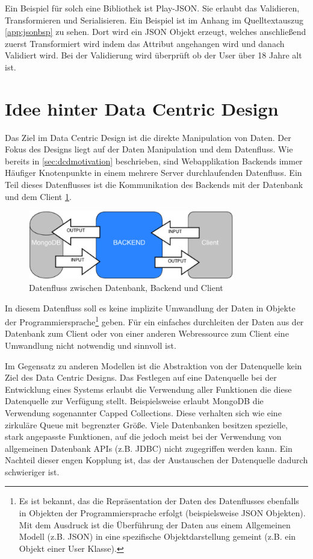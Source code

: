 Ein Beispiel für solch eine Bibliothek ist Play-JSON. Sie erlaubt das Validieren, Transformieren und Serialisieren. Ein Beispiel ist im Anhang im Quelltextauszug \ref{app:jsonbsp} zu sehen. Dort wird ein JSON Objekt erzeugt, welches anschließend zuerst Transformiert wird indem das Attribut  angehangen wird und danach Validiert wird. Bei der Validierung wird überprüft ob der User über 18 Jahre alt ist.

\section{Idee hinter Data Centric Design}
Das Ziel im Data Centric Design ist die direkte Manipulation von Daten. Der Fokus des Designs liegt auf der Daten Manipulation und dem Datenfluss. Wie bereits in \ref{sec:dcdmotivation} beschrieben, sind Webapplikation Backends immer Häufiger Knotenpunkte in einem mehrere Server durchlaufenden Datenfluss. Ein Teil dieses Datenflusses ist die Kommunikation des Backends mit der Datenbank und dem Client \ref{fig:dataflow}. 

\begin{figure}[h]   
  \centering     
  \includegraphics[width=0.8\textwidth]{img/dataflow.png}  
   \caption{Datenfluss zwischen Datenbank, Backend und Client}   
  \label{fig:dataflow} 
\end{figure}

In diesem Datenfluss soll es keine implizite Umwandlung der Daten in Objekte der Programmiersprache\footnote{Es ist bekannt, das die Repräsentation der Daten des Datenflusses ebenfalls in Objekten der Programmiersprache erfolgt (beispielsweise JSON Objekten). Mit dem Ausdruck ist die Überführung der Daten aus einem Allgemeinen Modell (z.B. JSON) in eine spezifische Objektdarstellung gemeint (z.B. ein Objekt einer User Klasse).} geben. Für ein einfaches durchleiten der Daten aus der Datenbank zum Client oder von einer anderen Webressource zum Client eine Umwandlung nicht notwendig und sinnvoll ist. 

Im Gegensatz zu anderen Modellen ist die Abstraktion von der Datenquelle kein Ziel des Data Centric Designs. Das Festlegen auf eine Datenquelle bei der Entwicklung eines Systems erlaubt die Verwendung aller Funktionen die diese Datenquelle zur Verfügung stellt. Beispielsweise erlaubt MongoDB die Verwendung sogenannter Capped Collections.  Diese verhalten sich wie eine zirkuläre Queue mit begrenzter Größe. Viele Datenbanken besitzen spezielle, stark angepasste Funktionen, auf die jedoch meist bei der Verwendung von allgemeinen Datenbank APIs (z.B. JDBC) nicht zugegriffen werden kann. Ein Nachteil dieser engen Kopplung ist, das der Austauschen der Datenquelle dadurch schwieriger ist. 

